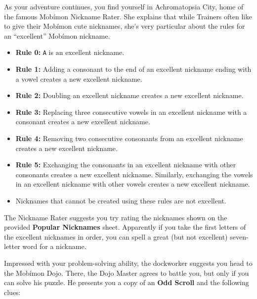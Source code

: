 \documentclass{puzzlehunt}
\newcommand{\mappMobimon}{Mob\'imon}
\begin{document}
\vfill

\newpage


As your adventure continues, you find yourself in
Achromatopsia City,
home of the famous \mappMobimon{} Nickname Rater.
She explains that while Trainers often like to give their
\mappMobimon{} cute nicknames, she's very particular about the rules
for an ``excellent'' \mappMobimon{} nickname.

\begin{multicols}{2}
\begin{itemize}
  \item \textbf{Rule 0:}
        \texttt{A} is an excellent nickname.
  \item \textbf{Rule 1:}
        Adding a consonant to the end of an excellent nickname ending with
        a vowel creates a new excellent nickname.
  \item \textbf{Rule 2:}
        Doubling an excellent nickname creates a new excellent nickname.
  \item \textbf{Rule 3:}
        Replacing three consecutive vowels in an excellent nickname with
        a consonant creates a new excellent nickname.
  \item \textbf{Rule 4:}
        Removing two consecutive consonants from an excellent nickname
        creates a new excellent nickname.
  \item \textbf{Rule 5:}
        Exchanging the consonants in an excellent nickname with other
        consonants creates a new excellent nickname. Similarly,
        exchanging the vowels in an excellent nickname with other vowels
        creates a new excellent nickname.
  \item Nicknames that cannot be created using these rules are not
        excellent.
\end{itemize}
\end{multicols}

The Nickname Rater suggests you try rating the nicknames shown on the provided 
\textbf{Popular Nicknames} sheet. Apparently if you take the first letters of the excellent nicknames in order, you can spell a great (but not excellent) seven-letter word for a nickname.

\vfill


Impressed with your problem-solving ability, the dockworker suggests you head to the \mappMobimon{} Dojo. There, the Dojo Master agrees to battle you, but only if you can solve his puzzle. He presents you a copy of an 
\textbf{Odd Scroll} and the following clues:
\end{document}
